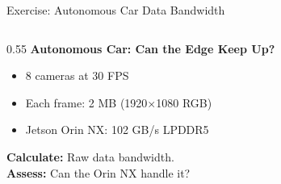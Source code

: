 \documentclass[aspectratio=169, 12pt]{beamer}
\begin{document}
\begin{frame}{Exercise: Autonomous Car Data Bandwidth}
\note{
%
%
%
%
%
}

\small
\begin{columns}[T]
  \begin{column}{0.55\textwidth}
    {\normalsize\bfseries Autonomous Car: Can the Edge Keep Up?}

    \vspace{0.2cm}
    \begin{itemize}\setlength\itemsep{0pt}
      \item 8 cameras at 30 FPS
      \item Each frame: 2 MB (1920$\times$1080 RGB)
      \item Jetson Orin NX: 102 GB/s LPDDR5
    \end{itemize}

    \vspace{0.15cm}
    \textbf{Calculate:} Raw data bandwidth.\\
    \textbf{Assess:} Can the Orin NX handle it?


\end{column}
\end{columns}
\end{frame}
\end{document}
